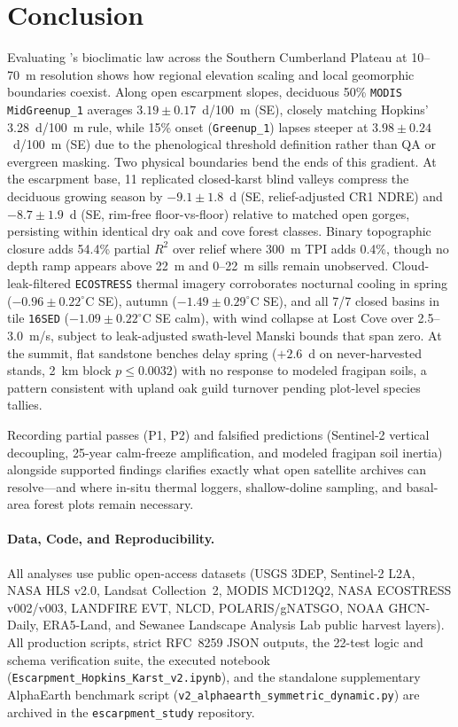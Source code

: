 \section{Conclusion}
\label{sec:conclusion}

Evaluating \citet{hopkins1918}'s bioclimatic law across the Southern Cumberland Plateau at 10--70~m resolution shows how regional elevation scaling and local geomorphic boundaries coexist. Along open escarpment slopes, deciduous 50\% \texttt{MODIS MidGreenup\_1} averages $3.19 \pm 0.17$~d/100~m (SE), closely matching Hopkins' 3.28~d/100~m rule, while 15\% onset (\texttt{Greenup\_1}) lapses steeper at $3.98 \pm 0.24$~d/100~m (SE) due to the phenological threshold definition rather than QA or evergreen masking. Two physical boundaries bend the ends of this gradient. At the escarpment base, 11 replicated closed-karst blind valleys compress the deciduous growing season by $-9.1 \pm 1.8$~d (SE, relief-adjusted CR1 NDRE) and $-8.7 \pm 1.9$~d (SE, rim-free floor-vs-floor) relative to matched open gorges, persisting within identical dry oak and cove forest classes. Binary topographic closure adds 54.4\% partial $R^2$ over relief where 300~m TPI adds 0.4\%, though no depth ramp appears above 22~m and 0--22~m sills remain unobserved. Cloud-leak-filtered \texttt{ECOSTRESS} thermal imagery corroborates nocturnal cooling in spring ($-0.96 \pm 0.22^\circ$C SE), autumn ($-1.49 \pm 0.29^\circ$C SE), and all 7/7 closed basins in tile \texttt{16SED} ($-1.09 \pm 0.22^\circ$C SE calm), with wind collapse at Lost Cove over 2.5--3.0~m/s, subject to leak-adjusted swath-level Manski bounds that span zero. At the summit, flat sandstone benches delay spring ($+2.6$~d on never-harvested stands, 2~km block $p \le 0.0032$) with no response to modeled fragipan soils, a pattern consistent with upland oak guild turnover pending plot-level species tallies.

Recording partial passes (P1, P2) and falsified predictions (Sentinel-2 vertical decoupling, 25-year calm-freeze amplification, and modeled fragipan soil inertia) alongside supported findings clarifies exactly what open satellite archives can resolve---and where in-situ thermal loggers, shallow-doline sampling, and basal-area forest plots remain necessary.

\paragraph{Data, Code, and Reproducibility.} All analyses use public open-access datasets (USGS 3DEP, Sentinel-2 L2A, NASA HLS v2.0, Landsat Collection~2, MODIS MCD12Q2, NASA ECOSTRESS v002/v003, LANDFIRE EVT, NLCD, POLARIS/gNATSGO, NOAA GHCN-Daily, ERA5-Land, and Sewanee Landscape Analysis Lab public harvest layers). All production scripts, strict RFC~8259 JSON outputs, the 22-test logic and schema verification suite, the executed notebook (\texttt{Escarpment\_\allowbreak Hopkins\_\allowbreak Karst\_\allowbreak v2.ipynb}), and the standalone supplementary AlphaEarth benchmark script (\texttt{v2\_\allowbreak alphaearth\_\allowbreak symmetric\_\allowbreak dynamic.py}) are archived in the \texttt{escarpment\_study} repository.
